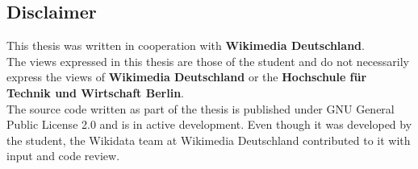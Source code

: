 \begin{centering}
\chapter*{Disclaimer}

This thesis was written in cooperation with \textbf{Wikimedia Deutschland}. \\
The views expressed in this thesis are those of the student and do not necessarily express the views of \textbf{Wikimedia Deutschland} or the \textbf{Hochschule für Technik und Wirtschaft Berlin}. \\
The source code written as part of the thesis is published under GNU General Public License 2.0 and is in active development. Even though it was developed by the student, the Wikidata team at Wikimedia Deutschland contributed to it with input and code review.

\end{centering}
